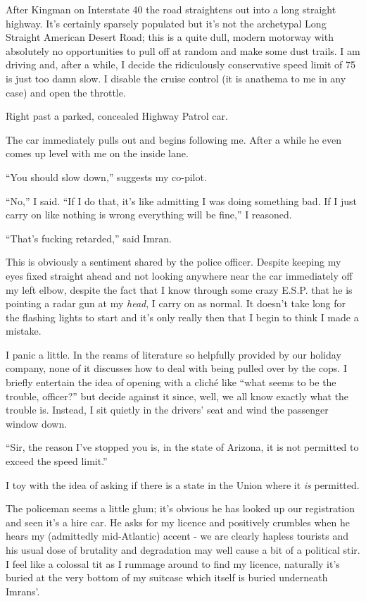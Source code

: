 \documentclass[a5paper,titlepage,11pt]{book}
\begin{document}
After Kingman on Interstate 40 the road straightens out into a long straight highway.  It's certainly sparsely populated but it's not the archetypal Long Straight American Desert Road; this is a quite dull, modern motorway with absolutely no opportunities to pull off at random and make some dust trails.  I am driving and, after a while, I decide the ridiculously conservative speed limit of 75 is just too damn slow.  I disable the cruise control (it is anathema to me in any case) and open the throttle.

Right past a parked, concealed Highway Patrol car.

The car immediately pulls out and begins following me.  After a while he even comes up level with me on the inside lane.

``You should slow down,'' suggests my co-pilot.

``No,'' I said.  ``If I do that, it's like admitting I was doing something bad.  If I just carry on like nothing is wrong everything will be fine,'' I reasoned.

``That's fucking retarded,'' said Imran.

This is obviously a sentiment shared by the police officer.  Despite keeping my eyes fixed straight ahead and not looking anywhere near the car immediately off my left elbow, despite the fact that I know through some crazy E.S.P. that he is pointing a radar gun at my \emph{head}, I carry on as normal.  It doesn't take long for the flashing lights to start and it's only really then that I begin to think I made a mistake.

I panic a little.  In the reams of literature so helpfully provided by our holiday company, none of it discusses how to deal with being pulled over by the cops.  I briefly entertain the idea of opening with a clich\'{e} like ``what seems to be the trouble, officer?'' but decide against it since, well, we all know exactly what the trouble is.  Instead, I sit quietly in the drivers' seat and wind the passenger window down.

``Sir, the reason I've stopped you is, in the state of Arizona, it is not permitted to exceed the speed limit.''

I toy with the idea of asking if there is a state in the Union where it \emph{is} permitted.

The policeman seems a little glum; it's obvious he has looked up our registration and seen it's a hire car.  He asks for my licence and positively crumbles when he hears my (admittedly mid-Atlantic) accent - we are clearly hapless tourists and his usual dose of brutality and degradation may well cause a bit of a political stir.  I feel like a colossal tit as I rummage around to find my licence, naturally it's buried at the very bottom of my suitcase which itself is buried underneath Imrans'.
\end{document}
